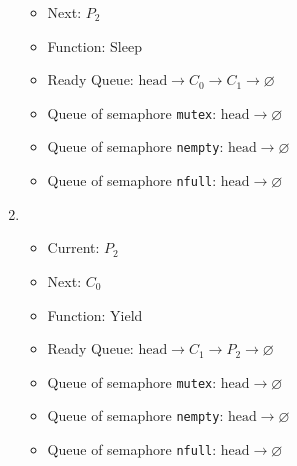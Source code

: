 \documentclass[11pt]{article}
\begin{document}
\begin{question}
\begin{enumerate}
{\begin{itemize}
                        \item{Next: $P_{2}$}
                        \item{Function: Sleep}
                        \item{
                            Ready Queue: $\text{head}\longrightarrow
                            C_{0}\longrightarrow
                            C_{1}\longrightarrow
                            \varnothing$
                        } \item{
                            Queue of semaphore {\tt mutex}: $\text{head}\longrightarrow
                            \varnothing$
                        }
                        \item{
                            Queue of semaphore {\tt nempty}: $\text{head}\longrightarrow
                            \varnothing$
                        }
                        \item{
                            Queue of semaphore {\tt nfull}: $\text{head}\longrightarrow
                            \varnothing$
                        }
                \end{itemize}}
                \item {
                    \begin{itemize}
                        \item{Current: $P_{2}$}
                        \item{Next: $C_{0}$}
                        \item{Function: Yield}
                        \item{
                            Ready Queue: $\text{head}\longrightarrow
                            C_{1}\longrightarrow
                            P_{2}\longrightarrow
                            \varnothing$
                        } \item{
                            Queue of semaphore {\tt mutex}: $\text{head}\longrightarrow
                            \varnothing$
                        }
                        \item{
                            Queue of semaphore {\tt nempty}: $\text{head}\longrightarrow
                            \varnothing$
                        }
                        \item{
                            Queue of semaphore {\tt nfull}: $\text{head}\longrightarrow
                            \varnothing$
                        }
                \end{itemize}}

\end{enumerate}
\end{question}
\end{document}
